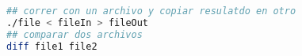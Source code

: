 \begin{lstlisting}[language=bash]
## correr con un archivo y copiar resulatdo en otro
./file < fileIn > fileOut
## comparar dos archivos
diff file1 file2
\end{lstlisting}

